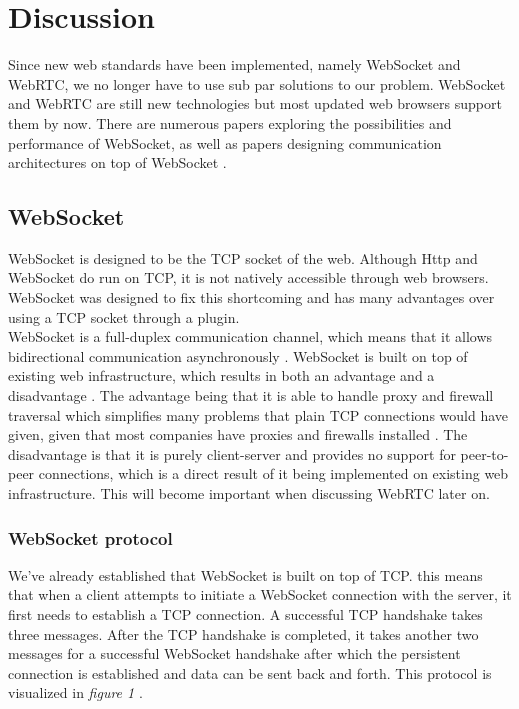 \documentclass[prodmode,acmtecs]{acmsmall}
\begin{document}
\section{Discussion}
Since new web standards have been implemented, namely WebSocket and WebRTC, we no longer have to use sub par solutions to our problem. WebSocket and WebRTC are still new technologies but most updated web browsers support them by now. There are numerous papers exploring the possibilities and performance of WebSocket, as well as papers designing communication architectures on top of WebSocket \cite{panagiotakis2013architecture}.

\subsection{WebSocket}
WebSocket is designed to be the TCP socket of the web. Although Http and WebSocket do run on TCP, it is not natively accessible through web browsers. WebSocket was designed to fix this shortcoming and has many advantages over using a TCP socket through a plugin. \\

WebSocket is a full-duplex communication channel, which means that it allows bidirectional communication asynchronously \cite{rakhundereal}. WebSocket is built on top of existing web infrastructure, which results in both an advantage and a disadvantage \cite{skvorc2014performance}. The advantage being that it is able to handle proxy and firewall traversal which simplifies many problems that plain TCP connections would have given, given that most companies have proxies and firewalls installed \cite{almasi2013evaluation}. The disadvantage is that it is purely client-server and provides no support for peer-to-peer connections, which is a direct result of it being implemented on existing web infrastructure. This will become important when discussing WebRTC later on. 

\subsubsection{WebSocket protocol}
We've already established that WebSocket is built on top of TCP. this means that when a client attempts to initiate a WebSocket connection with the server, it first needs to establish a TCP connection. A successful TCP handshake takes three messages. After the TCP handshake is completed, it takes another two messages for a successful WebSocket handshake after which the persistent connection is established and data can be sent back and forth. This protocol is visualized in \textit{figure 1} \cite{skvorc2014performance}.
\end{document}

